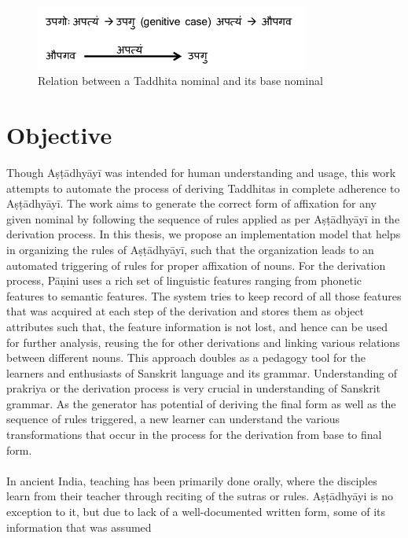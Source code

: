 \documentclass[a4paper,11pt,twoside,openright]{report}
\begin{document}
\begin{figure}[h]
    \centering
	\includegraphics[width=0.8\textwidth]{Upagu}
    \caption{Relation between a Taddhita nominal and its base nominal}
    \label{upagu}
\end{figure}

\section{Objective}

Though Aṣṭādhyāyī was intended for human understanding and usage, this work attempts to automate the process of deriving Taddhitas in complete adherence to Aṣṭādhyāyī. The work aims to generate the correct form of affixation for any given nominal by following the sequence of rules applied as per Aṣṭādhyāyī in the derivation process. In this thesis, we propose an implementation model that helps in organizing the rules of Aṣṭādhyāyī, such that the organization leads to an automated triggering of rules for proper affixation of nouns. For the derivation process, Pāṇini uses a rich set of linguistic features ranging from phonetic features to semantic features. The system tries to keep record of all those features that was acquired at each step of the derivation and stores them as object attributes such that, the feature information is not lost, and hence can be used for further analysis, reusing the for other derivations and linking various relations between different nouns. This approach doubles as a pedagogy tool for the learners and enthusiasts of Sanskrit language and its grammar. Understanding of prakriya or the derivation process is very crucial in understanding of Sanskrit grammar. As the generator has potential of deriving the final form as well as the sequence of rules triggered, a new learner can understand the various transformations that occur in the process for the derivation from base to final form.
\\ \\
In ancient India, teaching has been primarily done orally, where the disciples learn from
their teacher through reciting of the sutras or rules. Aṣṭādhyāyi is no exception to it, but
due to lack of a well-documented written form, some of its information that was assumed
\end{document}
